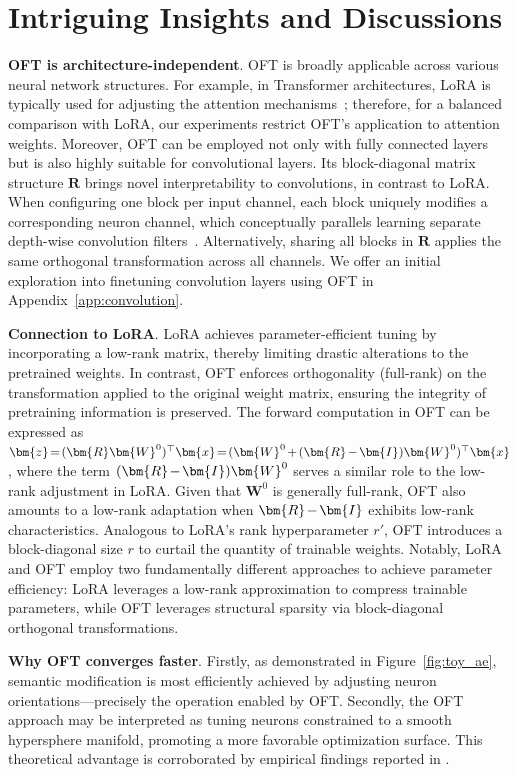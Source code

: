 \section{Intriguing Insights and Discussions}

\textbf{OFT is architecture-independent}. OFT is broadly applicable across various neural network structures. For example, in Transformer architectures, LoRA is typically used for adjusting the attention mechanisms~\cite{hulora2022}; therefore, for a balanced comparison with LoRA, our experiments restrict OFT’s application to attention weights. Moreover, OFT can be employed not only with fully connected layers but is also highly suitable for convolutional layers. Its block-diagonal matrix structure $\bm{R}$ brings novel interpretability to convolutions, in contrast to LoRA. When configuring one block per input channel, each block uniquely modifies a corresponding neuron channel, which conceptually parallels learning separate depth-wise convolution filters~\cite{chollet2017xception}. Alternatively, sharing all blocks in $\bm{R}$ applies the same orthogonal transformation across all channels. We offer an initial exploration into finetuning convolution layers using OFT in Appendix~\ref{app:convolution}.

\textbf{Connection to LoRA}. LoRA achieves parameter-efficient tuning by incorporating a low-rank matrix, thereby limiting drastic alterations to the pretrained weights. In contrast, OFT enforces orthogonality (full-rank) on the transformation applied to the original weight matrix, ensuring the integrity of pretraining information is preserved. The forward computation in OFT can be expressed as $\thickmuskip=2mu \medmuskip=2mu \bm{z}=(\bm{R}\bm{W}^0)^\top\bm{x}=(\bm{W}^0+(\bm{R}-\bm{I})\bm{W}^0)^\top\bm{x}$, where the term $\thickmuskip=2mu \medmuskip=2mu (\bm{R}-\bm{I})\bm{W}^0$ serves a similar role to the low-rank adjustment in LoRA. Given that $\bm{W}^0$ is generally full-rank, OFT also amounts to a low-rank adaptation when $\thickmuskip=2mu \medmuskip=2mu \bm{R}-\bm{I}$ exhibits low-rank characteristics. Analogous to LoRA's rank hyperparameter $r'$, OFT introduces a block-diagonal size $r$ to curtail the quantity of trainable weights. Notably, LoRA and OFT employ two fundamentally different approaches to achieve parameter efficiency: LoRA leverages a low-rank approximation to compress trainable parameters, while OFT leverages structural sparsity via block-diagonal orthogonal transformations.

\textbf{Why OFT converges faster}. Firstly, as demonstrated in Figure~\ref{fig:toy_ae}, semantic modification is most efficiently achieved by adjusting neuron orientations—precisely the operation enabled by OFT. Secondly, the OFT approach may be interpreted as tuning neurons constrained to a smooth hypersphere manifold, promoting a more favorable optimization surface. This theoretical advantage is corroborated by empirical findings reported in \cite{liu2021orthogonal}.

